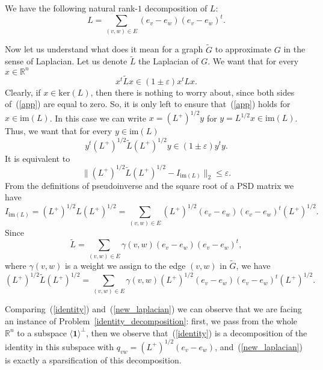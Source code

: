 \documentclass[12pt]{article}
\newcommand{\Rbb}{\mathbb{R}}
\newcommand{\eps}{\varepsilon}
\begin{document}
    We have the following natural rank-$1$ decomposition of $L$:
    \begin{equation}
        \label{ldec}
        L = \sum_{(v, w) \in E} (e_v - e_w) (e_v - e_w)^t.
    \end{equation}

    Now let us understand what does it mean for a graph $\tilde{G}$ to approximate
    $G$ in the sense of Laplacian. Let us denote $\tilde{L}$ the Laplacian of $G$.
    We want that for every $x \in \Rbb^n$
    \begin{equation}
        \label{app}
        x^t \tilde{L} x \in (1 \pm \eps) x^t L x.
    \end{equation}
    Clearly, if $x \in \mathrm{ker}(L)$, then there is nothing to worry about, since
    both sides of~(\ref{app}) are equal to zero. So, it is only left to ensure
    that~(\ref{app}) holds for $x \in \mathrm{im}(L)$.
    In this case we can write $x = (L^+)^{1/2} y$ for
    $y = L^{1/2} x \in \mathrm{im}(L)$.
    Thus, we want that for every $y \in \mathrm{im}(L)$
    $$
        y^t (L^+)^{1/2} \tilde{L} (L^+)^{1/2} y \in (1 \pm \eps) y^t y.
    $$
    It is equivalent to
    $$
        \|(L^+)^{1/2} \tilde{L} (L^+)^{1/2} - I_{\mathrm{im}(L)}\|_2 \leq \eps.
    $$
    From the definitions of pseudoinverse and the square root of a PSD matrix we have
    \begin{equation}
        \label{identity}
        I_{\mathrm{im}(L)} = (L^+)^{1/2} L (L^+)^{1/2} =
        \sum_{(v, w) \in E} (L^+)^{1/2} (e_v - e_w) (e_v - e_w)^t (L^+)^{1/2}.
    \end{equation}
    Since
    $$
        \tilde{L} = \sum_{(v, w) \in E} \gamma(v, w) (e_v - e_w) (e_v - e_w)^t,
    $$
    where $\gamma(v, w)$ is a weight we assign to the edge $(v, w)$ in $\tilde{G}$,
    we have
    \begin{equation}
        \label{new_laplacian}
        (L^+)^{1/2} \tilde{L} (L^+)^{1/2} = \sum_{(v, w) \in E}
        \gamma(v, w) (L^+)^{1/2} (e_v - e_w) (e_v - e_w)^t (L^+)^{1/2}.
    \end{equation}

    Comparing~(\ref{identity}) and~(\ref{new_laplacian}) we can observe that we
    are facing an instance of Problem~\ref{identity_decomposition}: first, we
    pass from the whole $\mathbb{R}^n$ to a subspace $\langle \mathbf{1} \rangle^{\perp}$,
    then we observe that~(\ref{identity}) is a decomposition of the identity in this
    subspace with $q_{vw} = (L^+)^{1/2} (e_v - e_w)$,
    and~(\ref{new_laplacian}) is exactly a sparsification of this decomposition.
\end{document}
